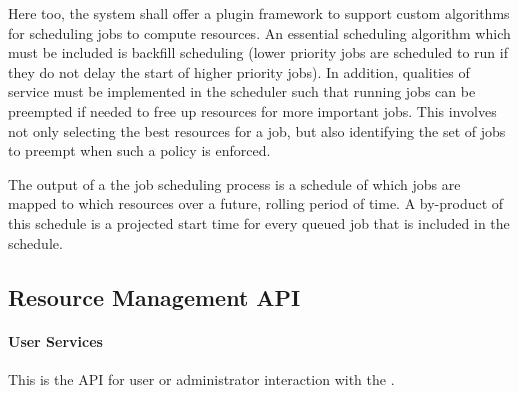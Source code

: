 Here too, the system shall offer a plugin framework to support custom
algorithms for scheduling jobs to compute resources.  An essential
scheduling algorithm which must be included is backfill scheduling
(lower priority jobs are scheduled to run if they do not delay the
start of higher priority jobs).  In addition, qualities of service must
be implemented in the scheduler such that running jobs can be
preempted if needed to free up resources for more important jobs.
This involves not only selecting the best resources for a job, but
also identifying the set of jobs to preempt when such a policy is
enforced.

The output of a the job scheduling process is a schedule of which jobs
are mapped to which resources over a future, rolling period of time.
A by-product of this schedule is a projected start time for every
queued job that is included in the schedule.




\subsection{Resource Management API}

\paragraph{User Services}
This is the API for user or administrator interaction with the \ngrm.

